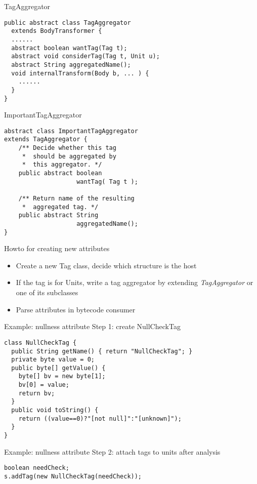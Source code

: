 \begin{slide}{TagAggregator}
{\small
\begin{verbatim}
public abstract class TagAggregator 
  extends BodyTransformer {
  ......
  abstract boolean wantTag(Tag t);
  abstract void considerTag(Tag t, Unit u);
  abstract String aggregatedName();
  void internalTransform(Body b, ... ) { 
    ...... 
  }
}
\end{verbatim}
}
\end{slide}

\begin{slide}{ImportantTagAggregator}
\vspace*{-6mm}
\begin{verbatim}
abstract class ImportantTagAggregator 
extends TagAggregator {    
    /** Decide whether this tag
     *  should be aggregated by
     *  this aggregator. */
    public abstract boolean
                    wantTag( Tag t );

    /** Return name of the resulting
     *  aggregated tag. */
    public abstract String 
                    aggregatedName();
}
\end{verbatim}
\end{slide}

\begin{slide}{Howto for creating new attributes}
\begin{itemize}
\item Create a new Tag class, decide which structure is the host
\item If the tag is for Units, write a tag aggregator by extending {\em TagAggregator} or one of its subclasses
\item Parse attributes in bytecode consumer
\end{itemize}
\end{slide}

\begin{slide}{Example: nullness attribute}
Step 1: create NullCheckTag
{\scriptsize
\begin{verbatim}
class NullCheckTag {
  public String getName() { return "NullCheckTag"; }
  private byte value = 0;
  public byte[] getValue() {
    byte[] bv = new byte[1];
    bv[0] = value;
    return bv;
  }
  public void toString() {
    return ((value==0)?"[not null]":"[unknown]");
  }
}
\end{verbatim}
}
\end{slide}

\begin{slide}{Example: nullness attribute}
Step 2: attach tags to units after analysis \\
\footnotesize{
\begin{verbatim}
boolean needCheck;
s.addTag(new NullCheckTag(needCheck));
\end{verbatim}
}
\end{slide}

